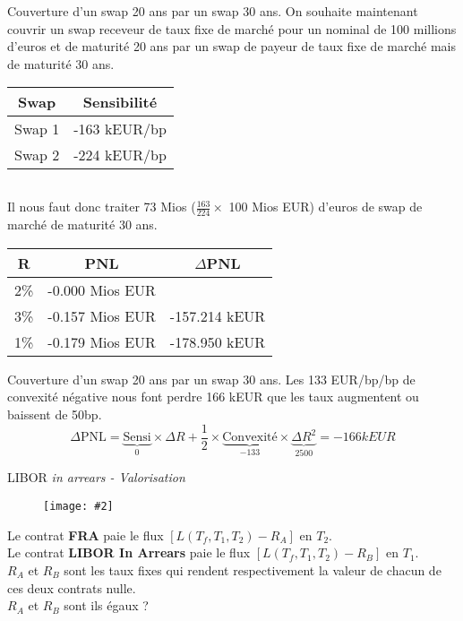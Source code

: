 \documentclass{beamer}
\newcommand{\FIG}[2]{\texttt{[image: \#2]}}
\begin{document}
\begin{frame}{Couverture d'un swap 20 ans par un swap 30 ans.}
On souhaite maintenant couvrir un swap receveur de taux fixe de marché pour un nominal de 100 millions d'euros et de maturité 20 ans par un swap de payeur de taux fixe de marché mais de maturité 30 ans.\\
\begin{center}
\begin{tabular}{|c|c|}
\hline
Swap&Sensibilité \\ 
\hline
Swap 1 &-163 kEUR/bp \\ 
Swap 2 &-224 kEUR/bp \\ 
\hline
\end{tabular}\begin{tabular}{|c|c|}
\end{tabular}
\end{center}
Il nous faut donc traiter 73 Mios ($\frac{163}{224} \times$ 100 Mios EUR)  d'euros de swap de marché de maturité  30 ans.
\begin{center}
\begin{tabular}{|c|c|c|}
\hline
R&PNL&$\Delta$PNL \\ 
\hline
2\% &-0.000 Mios EUR& \\ 
3\% &-0.157 Mios EUR&-157.214 kEUR\\ 
1\% &-0.179 Mios EUR&-178.950 kEUR\\ 
\hline
\end{tabular}
\end{center}
\end{frame}
\begin{frame}{Couverture d'un swap 20 ans par un swap 30 ans.}
Les 133 EUR/bp/bp de convexité négative nous font perdre 166 kEUR que les taux augmentent ou baissent de 50bp.
\[
\Delta \text{PNL}=\underbrace{\text{Sensi}}_{0} \times \Delta R + \frac{1}{2} \times \underbrace{\text{Convexité}}_{-133} \times \underbrace{\Delta R^2}_{2500}=-166 kEUR
\]
\end{frame}

\begin{frame}{LIBOR \it{in arrears} \textnormal{- Valorisation}}
\begin{figure}[h]
\FIG{7cm}{figures/schema_fra.jpg} 
\end{figure}

Le contrat \textbf{FRA} paie le flux $[L(T_f,T_1,T_2)-R_A]$ en $T_2$.\\
Le contrat \textbf{LIBOR In Arrears} paie  le flux $[L(T_f,T_1,T_2)-R_B]$ en $T_1$.\\
$R_A$ et $R_B$ sont les taux fixes qui rendent respectivement la valeur de chacun de ces deux contrats nulle.\\
\vspace{0.5cm}
$R_A$ et $R_B$ sont ils égaux ?

\end{frame}
\end{document}
